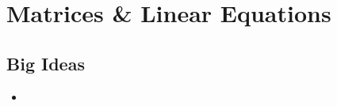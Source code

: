 \chapter{Matrices \& Linear Equations}
\label{chap:MLE}

\section{Big Ideas}
\label{sec:MLE Big Ideas}
\begin{itemize}
  \item 
\end{itemize}